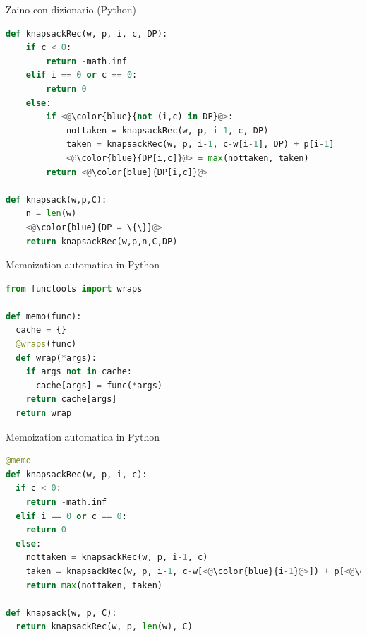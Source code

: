 \begin{frame}[fragile,shrink=5]{Zaino con dizionario (Python)}

\vspace{-18pt}
\begin{lstlisting}[language=python,tabsize=2]
def knapsackRec(w, p, i, c, DP):
	if c < 0:
		return -math.inf
	elif i == 0 or c == 0:
		return 0
	else:
		if <@\color{blue}{not (i,c) in DP}@>:
			nottaken = knapsackRec(w, p, i-1, c, DP)
			taken = knapsackRec(w, p, i-1, c-w[i-1], DP) + p[i-1]
			<@\color{blue}{DP[i,c]}@> = max(nottaken, taken)
		return <@\color{blue}{DP[i,c]}@>

def knapsack(w,p,C):
	n = len(w)
	<@\color{blue}{DP = \{\}}@>
	return knapsackRec(w,p,n,C,DP)
\end{lstlisting}

\end{frame}

\begin{frame}[fragile]{Memoization automatica in Python}

\vspace{-18pt}
\begin{lstlisting}[language=python]
from functools import wraps

def memo(func):
  cache = {}
  @wraps(func)
  def wrap(*args):
    if args not in cache:
      cache[args] = func(*args)
    return cache[args]
  return wrap
\end{lstlisting}


\end{frame}

\begin{frame}[fragile]{Memoization automatica in Python}

\vspace{-18pt}
\begin{lstlisting}[language=python]
@memo
def knapsackRec(w, p, i, c):
  if c < 0:
    return -math.inf
  elif i == 0 or c == 0:
    return 0
  else:
    nottaken = knapsackRec(w, p, i-1, c)
    taken = knapsackRec(w, p, i-1, c-w[<@\color{blue}{i-1}@>]) + p[<@\color{blue}{i-1}@>]
    return max(nottaken, taken) 

def knapsack(w, p, C):
  return knapsackRec(w, p, len(w), C)

\end{lstlisting}



\end{frame}


